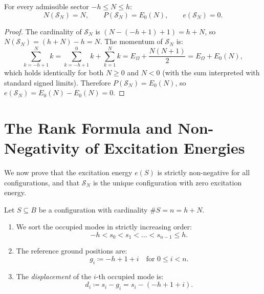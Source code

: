 \begin{lemma}
\label{lem:ground_values}
For every admissible sector $-h \le N \le h$:
\begin{equation}
N(\mathcal{S}_N) = N, \qquad P(\mathcal{S}_N) = E_0(N), \qquad e(\mathcal{S}_N) = 0.
\end{equation}
\end{lemma}

\begin{proof}
The cardinality of $\mathcal{S}_N$ is $(N - (-h+1) + 1) = h + N$, so $N(\mathcal{S}_N) = (h+N) - h = N$.
The momentum of $\mathcal{S}_N$ is:
\[
\sum_{k=-h+1}^N k = \sum_{k=-h+1}^0 k + \sum_{k=1}^N k = E_\Omega + \frac{N(N+1)}{2} = E_\Omega + E_0(N),
\]
which holds identically for both $N \ge 0$ and $N < 0$ (with the sum interpreted with standard signed limits).
Therefore $P(\mathcal{S}_N) = E_0(N)$, so $e(\mathcal{S}_N) = E_0(N) - E_0(N) = 0$.
\end{proof}

\section{The Rank Formula and Non-Negativity of Excitation Energies}

We now prove that the excitation energy $e(S)$ is strictly non-negative for all configurations, and that $\mathcal{S}_N$ is the unique configuration with zero excitation energy.

\begin{definition}
Let $S \subseteq B$ be a configuration with cardinality $\#S = n = h + N$.
\begin{enumerate}
    \item We sort the occupied modes in strictly increasing order:
    \begin{equation}
    -h < s_0 < s_1 < \dots < s_{n-1} \le h.
    \end{equation}
    \item The reference ground positions are:
    \begin{equation}
    g_i \coloneqq -h + 1 + i \quad \text{for } 0 \le i < n.
    \end{equation}
    \item The \emph{displacement} of the $i$-th occupied mode is:
    \begin{equation}
    d_i \coloneqq s_i - g_i = s_i - (-h + 1 + i).
    \end{equation}
\end{enumerate}
\end{definition}

